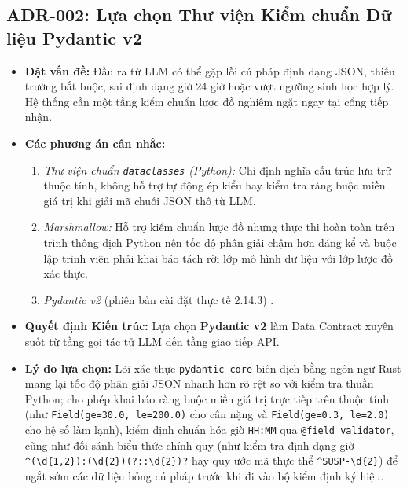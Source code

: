 \subsection{ADR-002: Lựa chọn Thư viện Kiểm chuẩn Dữ liệu Pydantic v2}
\begin{itemize}[leftmargin=1.5cm]
    \item \textbf{Đặt vấn đề:} Đầu ra từ LLM có thể gặp lỗi cú pháp định dạng JSON, thiếu trường bắt buộc, sai định dạng giờ 24 giờ hoặc vượt ngưỡng sinh học hợp lý. Hệ thống cần một tầng kiểm chuẩn lược đồ nghiêm ngặt ngay tại cổng tiếp nhận.
    \item \textbf{Các phương án cân nhắc:}
    \begin{enumerate}
        \item \textit{Thư viện chuẩn \texttt{dataclasses} (Python):} Chỉ định nghĩa cấu trúc lưu trữ thuộc tính, không hỗ trợ tự động ép kiểu hay kiểm tra ràng buộc miền giá trị khi giải mã chuỗi JSON thô từ LLM.
        \item \textit{Marshmallow:} Hỗ trợ kiểm chuẩn lược đồ nhưng thực thi hoàn toàn trên trình thông dịch Python nên tốc độ phân giải chậm hơn đáng kể và buộc lập trình viên phải khai báo tách rời lớp mô hình dữ liệu với lớp lược đồ xác thực.
        \item \textit{Pydantic v2} (phiên bản cài đặt thực tế 2.14.3) \cite{pydantic2024}.
    \end{enumerate}
    \item \textbf{Quyết định Kiến trúc:} Lựa chọn \textbf{Pydantic v2} làm Data Contract xuyên suốt từ tầng gọi tác tử LLM đến tầng giao tiếp API.
    \item \textbf{Lý do lựa chọn:} Lõi xác thực \texttt{pydantic-core} biên dịch bằng ngôn ngữ Rust mang lại tốc độ phân giải JSON nhanh hơn rõ rệt so với kiểm tra thuần Python; cho phép khai báo ràng buộc miền giá trị trực tiếp trên thuộc tính (như \texttt{Field(ge=30.0, le=200.0)} cho cân nặng và \texttt{Field(ge=0.3, le=2.0)} cho hệ số làm lạnh), kiểm định chuẩn hóa giờ \texttt{HH:MM} qua \texttt{@field\_validator}, cũng như đối sánh biểu thức chính quy (như kiểm tra định dạng giờ \texttt{\textasciicircum(\textbackslash d\{1,2\}):(\textbackslash d\{2\})(?::\textbackslash d\{2\})?\textdollar} hay quy ước mã thực thể \texttt{\textasciicircum SUSP-\textbackslash d\{2\}\textdollar}) để ngắt sớm các dữ liệu hỏng cú pháp trước khi đi vào bộ kiểm định ký hiệu.
\end{itemize}

